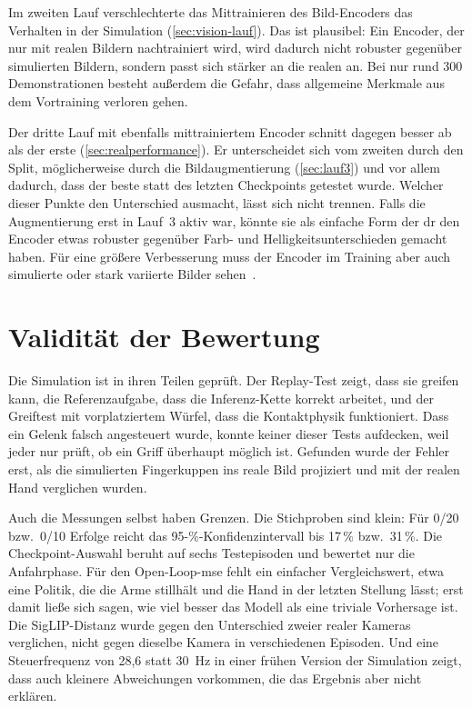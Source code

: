 Im zweiten Lauf verschlechterte das Mittrainieren des Bild-Encoders das
Verhalten in der Simulation (\cref{sec:vision-lauf}). Das ist plausibel: Ein
Encoder, der nur mit realen Bildern nachtrainiert wird, wird dadurch nicht
robuster gegenüber simulierten Bildern, sondern passt sich stärker an die
realen an. Bei nur rund 300 Demonstrationen besteht außerdem die Gefahr, dass
allgemeine Merkmale aus dem Vortraining verloren gehen.

Der dritte Lauf mit ebenfalls mittrainiertem Encoder schnitt dagegen besser ab
als der erste (\cref{sec:realperformance}). Er unterscheidet sich vom zweiten
durch den Split, möglicherweise durch die Bildaugmentierung
(\cref{sec:lauf3}) und vor allem dadurch, dass der beste statt des letzten
Checkpoints getestet wurde. Welcher dieser Punkte den Unterschied ausmacht,
lässt sich nicht trennen. Falls die Augmentierung erst in Lauf~3 aktiv war,
könnte sie als einfache Form der \ac{dr} den Encoder etwas robuster gegenüber
Farb- und Helligkeitsunterschieden gemacht haben. Für eine größere
Verbesserung muss der Encoder im Training aber auch simulierte oder stark
variierte Bilder sehen~\cite{tobin2017domain,cotrain2025}.

\section{Validität der Bewertung}
\label{sec:validitaet}

Die Simulation ist in ihren Teilen geprüft. Der Replay-Test zeigt, dass sie
greifen kann, die Referenzaufgabe, dass die Inferenz-Kette korrekt arbeitet,
und der Greiftest mit vorplatziertem Würfel, dass die Kontaktphysik
funktioniert. Dass ein Gelenk falsch angesteuert wurde, konnte keiner dieser
Tests aufdecken, weil jeder nur prüft, ob ein Griff überhaupt möglich ist.
Gefunden wurde der Fehler erst, als die simulierten Fingerkuppen ins reale
Bild projiziert und mit der realen Hand verglichen wurden.

Auch die Messungen selbst haben Grenzen. Die Stichproben sind klein: Für 0/20
bzw.\ 0/10 Erfolge reicht das 95-\%-Konfidenzintervall bis 17\,\% bzw.\
31\,\%. Die Checkpoint-Auswahl beruht auf sechs Testepisoden und bewertet nur
die Anfahrphase. Für den Open-Loop-\ac{mse} fehlt ein einfacher
Vergleichswert, etwa eine Politik, die die Arme stillhält und die Hand in der
letzten Stellung lässt; erst damit ließe sich sagen, wie viel besser das
Modell als eine triviale Vorhersage ist. Die SigLIP-Distanz wurde gegen den
Unterschied zweier realer Kameras verglichen, nicht gegen dieselbe Kamera in
verschiedenen Episoden. Und eine Steuerfrequenz von 28,6 statt 30~Hz in einer
frühen Version der Simulation zeigt, dass auch kleinere Abweichungen vorkommen,
die das Ergebnis aber nicht erklären.

